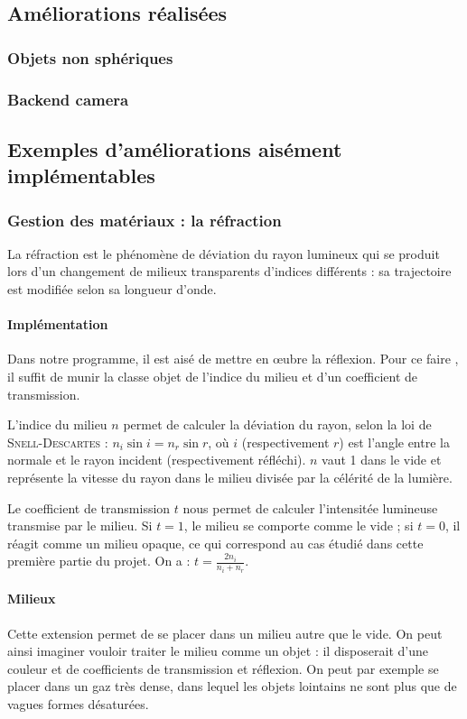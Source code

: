 \documentclass{article}
\begin{document}
\subsection{Améliorations réalisées}
\subsubsection{Objets non sphériques}


\subsubsection{Backend camera}

\subsection{Exemples d'améliorations aisément implémentables}
\subsubsection{Gestion des matériaux : la réfraction}
La réfraction est le phénomène de déviation du rayon lumineux qui se produit
lors d’un changement de milieux transparents d’indices différents : sa
trajectoire est modifiée selon sa longueur d'onde.

\paragraph{Implémentation}
Dans notre programme, il est aisé de mettre en œubre la réflexion. Pour ce faire
, il suffit de munir la classe objet de l'indice du milieu et d'un coefficient
de transmission.

L'indice du milieu $n$ permet de calculer la déviation du rayon, selon la loi de
\textsc{Snell-Descartes} : $n_i \sin i = n_r \sin r$, où $i$ (respectivement $r$)
est l'angle entre la normale et le rayon incident (respectivement réfléchi). $n$
vaut 1 dans le vide et représente la vitesse du rayon dans le milieu divisée par
la célérité de la lumière.

Le coefficient de transmission $t$ nous permet de calculer l'intensitée lumineuse
transmise par le milieu. Si $t=1$, le milieu se comporte comme le vide ; si $t=0$,
il réagit comme un milieu opaque, ce qui correspond au cas étudié dans cette
première partie du projet. On a : $t=\frac{2n_i}{n_i + n_r}$.

\paragraph{Milieux}
Cette extension permet de se placer dans un milieu autre que le vide. On peut
ainsi imaginer vouloir traiter le milieu comme un objet : il disposerait d'une
couleur et de coefficients de transmission et réflexion. On peut par exemple se
placer dans un gaz très dense, dans lequel les objets lointains ne sont plus que
de vagues formes désaturées.
\end{document}
